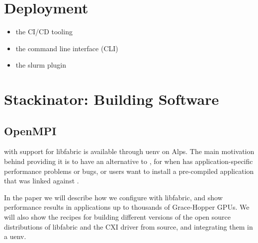 \section{Deployment}
\label{sec:deployment}


\begin{itemize}
\item the CI/CD tooling
\item the command line interface (CLI)
\item the slurm plugin
\end{itemize}

\section{Stackinator: Building Software}

\subsection{}

\subsection{OpenMPI}

\openmpi with support for libfabric is available through uenv on Alps.
The main motivation behind providing it is to have an alternative to \craympich, for when \craympich has application-specific performance problems or bugs, or users want to install a pre-compiled application that was linked against \openmpi.

In the paper we will describe how we configure \openmpi with libfabric, and show performance results in applications up to thousands of Grace-Hopper GPUs.
We will also show the recipes for building different versions of the open source distributions of libfabric and the CXI driver from source, and integrating them in a uenv.

